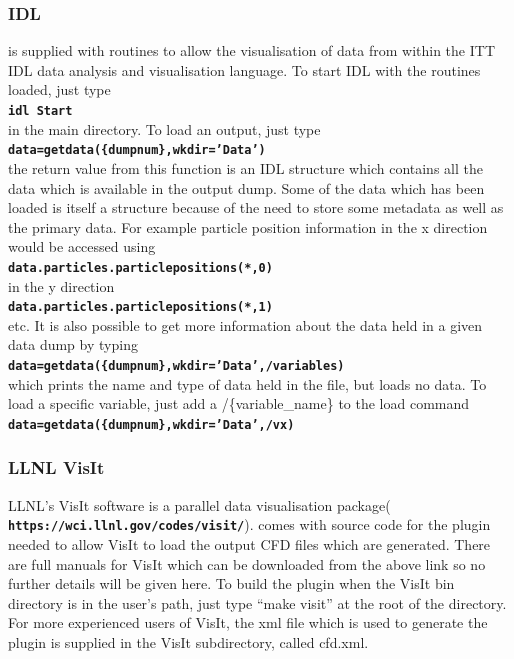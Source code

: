 \documentclass[12pt,a4paper]{article}
\newcommand{\inlinecode}[1]{{\color{warwickred} \bf\texttt{#1}}}
\newcommand{\EPOCH}{{\color{warwickdark}\fontfamily{phv}\selectfont{EPOCH}}}
\begin{document}
\subsubsection{IDL}
{\EPOCH} is supplied with routines to allow the visualisation of data from
within the ITT IDL data analysis and visualisation language. To start IDL with
the routines loaded, just type\\
\inlinecode{idl Start}\\
in the main {\EPOCH} directory. To load an output, just type\\
\inlinecode{data=getdata(\{dumpnum\},wkdir='Data')}\\
the return value from this function is an IDL structure which contains all the
data which is available in the output dump. Some of the data which has been
loaded is itself a structure because of the need to store some metadata as
well as the primary data. For example particle position information in the x
direction would be accessed using\\
\inlinecode{data.particles.particlepositions(*,0)}\\
in the y direction\\
\inlinecode{data.particles.particlepositions(*,1)}\\
etc. It is also possible to get more information about the data held in a
given data dump by typing\\
\inlinecode{data=getdata(\{dumpnum\},wkdir='Data',/variables)}\\
which prints the name and type of data held in the file, but loads no data. To
load a specific variable, just add a /\{variable\_name\} to the load command\\
\inlinecode{data=getdata(\{dumpnum\},wkdir='Data',/vx)}\\

\subsubsection{LLNL VisIt}
LLNL's VisIt software is a parallel data visualisation
package(\inlinecode{https://wci.llnl.gov/codes/visit/}). {\EPOCH} comes with
source code for the plugin needed to allow VisIt to load the output CFD files
which are generated. There are full manuals for VisIt which can be downloaded
from the above link so no further details will be given here. To build the
plugin when the VisIt bin directory is in the user's path, just type ``make
visit'' at the root of the {\EPOCH} directory. For more experienced users of
VisIt, the xml file which is used to generate the plugin is supplied in the
VisIt subdirectory, called cfd.xml.
\end{document}
